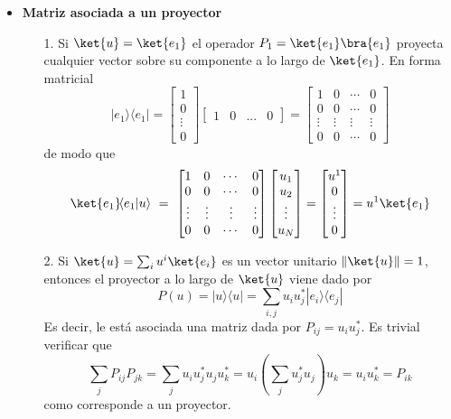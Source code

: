 \documentclass[a4paper,11pt]{book} %
\numberwithin{equation}{chapter}
\newcommand{\braket}[2]{\langle #1|#2\rangle}
\newcommand{\ketbra}[2]{| #1\rangle \! \langle #2|}
\begin{document}
\begin{itemize}

	\item \textbf{Matriz asociada a un proyector}

\begin{itemize}

	\item[1.] Si $\ket{u} = \ket{e_1}$ el operador $P_1 = \ket{e_1}\bra{e_1}$ proyecta cualquier vector sobre su componente a lo largo de $\ket{e_1}$.    En forma matricial
 \begin{equation}
\ketbra{e_1}{e_1} = \begin{bmatrix} 1 \\ 0 \\ \vdots\\ 0 \end{bmatrix} \begin{bmatrix} 1 & 0 & ...& 0 \end{bmatrix}  =
 \begin{bmatrix} 1 & 0 &  \cdots & 0 \\ 0 & 0  & \cdots & 0 \\ 
 \vdots & \vdots &\vdots & \vdots  \\
 0  & 0 & \cdots & 0\end{bmatrix}
 \end{equation}
de modo que
\begin{equation}
    \ket{e_1} \! \braket{e_1}{u} ~= ~\begin{bmatrix} 1 & 0 &  \cdots & 0 \\ 0 & 0  & \cdots & 0 \\ 
 \vdots & \vdots &\vdots & \vdots  \\
 0  & 0 & \cdots & 0\end{bmatrix} \begin{bmatrix} u_1 \\ u_2 \\ \vdots \\ u_N \end{bmatrix}
 = \begin{bmatrix} u^1 \\ 0 \\ \vdots \\ 0 \end{bmatrix} = u^1 \ket{e_1}
\end{equation}

	\item[2.] Si $\ket{u} = \sum_i u^i\ket{e_i}$ es un vector unitario  $\|\ket{u}\|=1$, entonces el proyector a lo largo de $\ket{u}$ viene dado por
	\begin{equation}
	\boxed{P(u) = \ketbra{u}{u} = \sum_{i,j} u_i u^*_j \ketbra{e_i}{e_j}}
	\end{equation}
Es decir, le está asociada una matriz dada por $P_{ij}=u_iu^*_j$. Es trivial verificar que 
\begin{equation}
\sum_j P_{ij}P_{jk} = \sum_j u_i u^*_j u_j u^*_k = u_i\left(\sum_j u^*_j u_j\right) u_k = u_i u_k^* = P_{ik}
\end{equation}
como corresponde a un proyector.
\end{itemize}		



\end{itemize}
\end{document}
